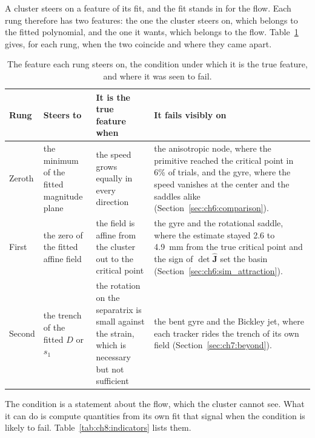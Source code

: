 A cluster steers on a feature of its fit, and the fit stands in for the
flow. Each rung therefore has two features: the one the cluster steers on,
which belongs to the fitted polynomial, and the one it wants, which belongs
to the flow. Table~\ref{tab:ch8:fitted_true} gives, for each rung, when the
two coincide and where they came apart.

\begin{table}[htbp]
\centering
\caption{The feature each rung steers on, the condition under which it is
the true feature, and where it was seen to fail.}
\label{tab:ch8:fitted_true}
\small
\begin{tabular}{>{\raggedright\arraybackslash}p{1.4cm} >{\raggedright\arraybackslash}p{3.0cm} >{\raggedright\arraybackslash}p{3.4cm} >{\raggedright\arraybackslash}p{4.6cm}}
\hline
Rung & Steers to & It is the true feature when & It fails visibly on \\
\hline
Zeroth & the minimum of the fitted magnitude plane & the speed grows equally in every direction & the anisotropic node, where the primitive reached the critical point in 6\% of trials, and the gyre, where the speed vanishes at the center and the saddles alike (Section~\ref{sec:ch6:comparison}). \\
First & the zero of the fitted affine field & the field is affine from the cluster out to the critical point & the gyre and the rotational saddle, where the estimate stayed 2.6 to 4.9~mm from the true critical point and the sign of $\det\hat{\mathbf{J}}$ set the basin (Section~\ref{sec:ch6:sim_attraction}). \\
Second & the trench of the fitted $D$ or $s_1$ & the rotation on the separatrix is small against the strain, which is necessary but not sufficient & the bent gyre and the Bickley jet, where each tracker rides the trench of its own field (Section~\ref{sec:ch7:beyond}). \\
\hline
\end{tabular}
\end{table}

The condition is a statement about the flow, which the cluster cannot see.
What it can do is compute quantities from its own fit that signal when the
condition is likely to fail. Table~\ref{tab:ch8:indicators} lists them.

